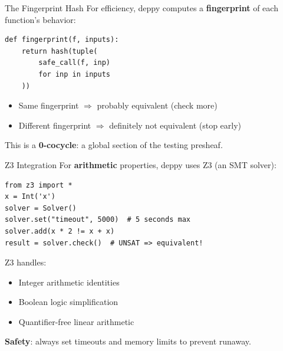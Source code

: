 \documentclass[aspectratio=169,11pt]{beamer}
\begin{document}
\begin{frame}{The Fingerprint Hash}
For efficiency, deppy computes a \textbf{fingerprint} of each function's behavior:

\begin{lstlisting}[language=deppy, basicstyle=\small\ttfamily]
def fingerprint(f, inputs):
    return hash(tuple(
        safe_call(f, inp)
        for inp in inputs
    ))
\end{lstlisting}

\vspace{0.3em}
\begin{itemize}
\item Same fingerprint $\Rightarrow$ probably equivalent (check more)
\item Different fingerprint $\Rightarrow$ definitely not equivalent (stop early)
\end{itemize}

This is a \textbf{0-cocycle}: a global section of the testing presheaf.
\end{frame}

\begin{frame}{Z3 Integration}
For \textbf{arithmetic} properties, deppy uses Z3 (an SMT solver):

\begin{lstlisting}[language=deppy, basicstyle=\small\ttfamily]
from z3 import *
x = Int('x')
solver = Solver()
solver.set("timeout", 5000)  # 5 seconds max
solver.add(x * 2 != x + x)
result = solver.check()  # UNSAT => equivalent!
\end{lstlisting}

\vspace{0.3em}
Z3 handles:
\begin{itemize}
\item Integer arithmetic identities
\item Boolean logic simplification
\item Quantifier-free linear arithmetic
\end{itemize}

\vspace{0.3em}
\textbf{Safety}: always set timeouts and memory limits to prevent runaway.
\end{frame}
\end{document}
